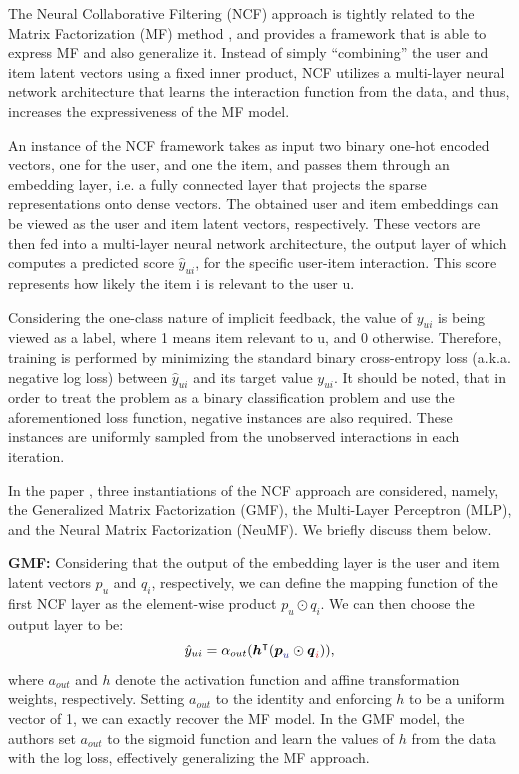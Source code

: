 
The Neural Collaborative Filtering (NCF) approach \cite{he2017neural} is tightly related to the Matrix Factorization (MF) method \cite{koren2009matrix}, and provides a framework that is able to express MF and also generalize it.
Instead of simply ``combining'' the user and item latent vectors using a fixed inner product, NCF utilizes a multi-layer neural network architecture that learns the interaction function from the data, and thus, increases the expressiveness of the MF model.

An instance of the NCF framework takes as input two binary one-hot encoded vectors, one for the user, and one the item, and passes them through an embedding layer, i.e. a fully connected layer that projects the sparse representations onto dense vectors.
The obtained user and item embeddings can be viewed as the user and item latent vectors, respectively.
These vectors are then fed into a multi-layer neural network architecture, the output layer of which computes a predicted score $\hat{y}_{ui}$, for the specific user-item interaction.
This score represents how likely the item i is relevant to the user u.

Considering the one-class nature of implicit feedback, the value of $y_{ui}$ is being viewed as a label, where 1 means item relevant to u, and 0 otherwise.
Therefore, training is performed by minimizing the standard binary cross-entropy loss (a.k.a. negative log loss) between $\hat{y}_{ui}$ and its target value $y_{ui}$.
It should be noted, that in order to treat the problem as a binary classification problem and use the aforementioned loss function, negative instances are also required.
These instances are uniformly sampled from the unobserved interactions in each iteration.

In the paper \cite{he2017neural}, three instantiations of the NCF approach are considered, namely, the Generalized Matrix Factorization (GMF), the Multi-Layer Perceptron (MLP), and the Neural Matrix Factorization (NeuMF).
We briefly discuss them below.

\textbf{GMF:} Considering that the output of the embedding layer is the user and item latent vectors $p_u$ and $q_i$, respectively, we can define the mapping function of the first NCF layer as the element-wise product $p_u \odot q_i$.
We can then choose the output layer to be:
\begin{equation}
    \hat{y}_{ui} = \alpha_{out}(\vec{h}^{\T}(\vec{p}_{\idxu} \odot \vec{q}_{\idxi})),
\end{equation}
where $a_{out}$ and $h$ denote the activation function and affine transformation weights, respectively.
Setting $a_{out}$ to the identity and enforcing $h$ to be a uniform vector of 1, we can exactly recover the MF model.
In the GMF model, the authors set $a_{out}$ to the sigmoid function and learn the values of $h$ from the data with the log loss, effectively generalizing the MF approach.

